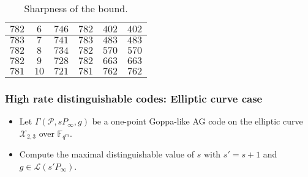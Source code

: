 \documentclass[
10pt, %
%
aspectratio=169, %
]{beamer}
\theoremstyle{plain}%
\theoremstyle{definition}
\theoremstyle{remark}
\newcommand{\calP}{\mathcal{P}}
\newcommand{\calL}{\mathcal{L}}
\newcommand{\calX}{\mathcal{X}}
\newcommand{\fqm}{\mathbb{F}_{q^m}}
\begin{document}
\begin{frame}
\begin{table}[h]
\begin{center}
{\begin{tabular}{|c|c|c|c|c|c|}
				\hline \hline
				$782$ &$6$& $746$&$782$ &$402$ & $402$  \\
				\hline
				$783$ &$7$& $741$& $783$&$483$ & $483$  \\
				\hline \hline
				$782$ &$8$& $734$& $782$&$570$ & $570$   \\
				\hline
				$782$ &$9$& $728$& $782$&$663$ & $663$ \\
				\hline
				$781$ &$10$& $721$ & $781$&$762$ & $762$ \\
				\hline
			\end{tabular}
			}
			\caption{Sharpness of the bound.} \label{table:expl_sharpness}
		\end{center}
	\end{table}
\end{frame}
\begin{frame}
	\frametitle{High rate distinguishable codes: Elliptic curve case }
	
	\begin{itemize}
		\item Let $\Gamma(\calP,sP_\infty,g)$ be a one-point Goppa-like AG code on the elliptic curve  $\calX_{2,3}$ over $\fqm$.
		\item Compute the maximal distinguishable value of $s$ with $s'=s+1$ and $g\in \calL(s'P_{\infty})$.
	\end{itemize}
	
	\begin{table}[h]
		\begin{center}
			\vspace*{0.3em}
			\caption{Largest distinguishable Goppa--like AG code in elliptic case.}
		\end{center}
	\end{table}
	
\end{frame}
\end{document}
